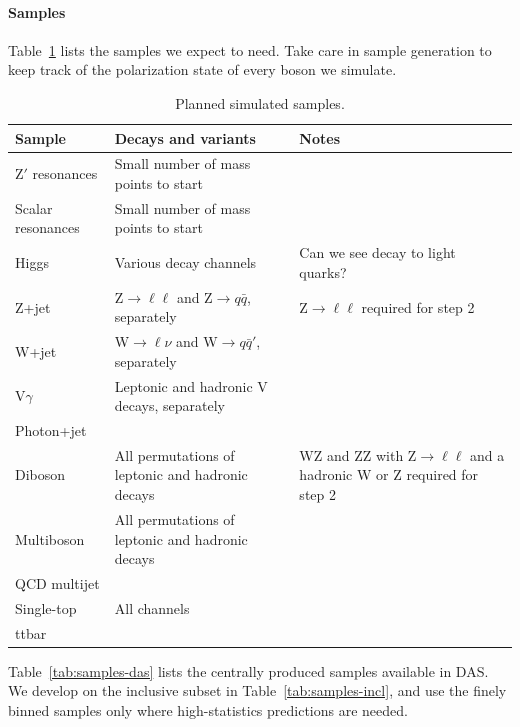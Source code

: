 \documentclass[11pt]{article}
\begin{document}
\paragraph{Samples}
Table~\ref{tab:samples} lists the samples we expect to need.
Take care in sample generation to keep track of the polarization state of every boson we simulate.

\begin{table}[htbp]
    \centering
    \caption{Planned simulated samples.\label{tab:samples}}
    \begin{tabularx}{\textwidth}{@{}l>{\raggedright\arraybackslash}X>{\raggedright\arraybackslash}X@{}}
        \toprule
        Sample & Decays and variants & Notes \\
        \midrule
        Z\('\) resonances & Small number of mass points to start & \\
        Scalar resonances & Small number of mass points to start & \\
        Higgs & Various decay channels & Can we see decay to light quarks? \\
        \midrule
        Z+jet & Z\(\to\ell\ell\) and Z\(\to q\bar{q}\), separately & Z\(\to\ell\ell\) required for step 2 \\
        W+jet & W\(\to\ell\nu\) and W\(\to q\bar{q}'\), separately & \\
        V\(\gamma\) & Leptonic and hadronic V decays, separately & \\
        Photon+jet & & \\
        \midrule
        Diboson & All permutations of leptonic and hadronic decays & WZ and ZZ with Z\(\to\ell\ell\) and a hadronic W or Z required for step 2 \\
        Multiboson & All permutations of leptonic and hadronic decays & \\
        \midrule
        QCD multijet & & \\
        Single-top & All channels & \\
        ttbar & & \\
        \bottomrule
    \end{tabularx}
\end{table}

Table~\ref{tab:samples-das} lists the centrally produced samples available in DAS. We develop on the inclusive subset in Table~\ref{tab:samples-incl}, and use the finely binned samples only where high-statistics predictions are needed.


\end{document}
